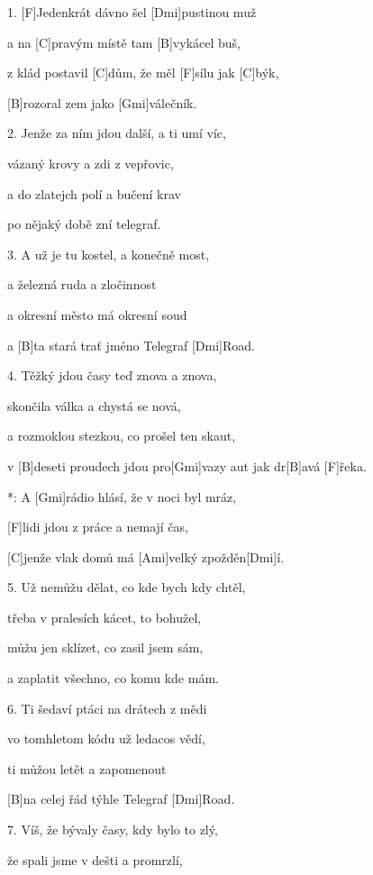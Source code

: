 
1. [F]Jedenkrát dávno šel [Dmi]pustinou muž

a na [C]pravým místě tam [B]vykácel buš,

z klád postavil [C]dům, že měl [F]sílu jak [C]býk,

[B]rozoral zem jako [Gmi]válečník.



2. Jenže za ním jdou další, a ti umí víc,

vázaný krovy a zdi z vepřovic,

a do zlatejch polí a bučení krav

po nějaký době zní telegraf.

3. A už je tu kostel, a konečně most,

a železná ruda a zločinnost

a okresní město má okresní soud

a [B]ta stará trať jméno Telegraf [Dmi]Road.



4. Těžký jdou časy teď znova a znova,

skončila válka a chystá se nová,

a rozmoklou stezkou, co prošel ten skaut,

v [B]deseti proudech jdou pro[Gmi]vazy aut jak dr[B]avá [F]\null řeka.



*: A [Gmi]rádio hlásí, že v noci byl mráz,

[F]lidi jdou z práce a nemají čas,

[C]jenže vlak domů má [Ami]velký zpožděn[Dmi]\null í.



5. Už nemůžu dělat, co kde bych kdy chtěl,

třeba v pralesích kácet, to bohužel,

můžu jen sklízet, co zasil jsem sám,

a zaplatit všechno, co komu kde mám.

6. Ti šedaví ptáci na drátech z mědi

vo tomhletom kódu už ledacos vědí,

ti můžou letět a zapomenout

[B]na celej řád týhle Telegraf [Dmi]Road.



7. Víš, že bývaly časy, kdy bylo to zlý,

že spali jsme v dešti a promrzlí,

